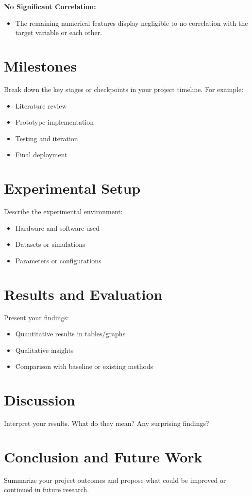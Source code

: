 \documentclass[conference]{IEEEtran}
\begin{document}
\textbf{No Significant Correlation:}
\begin{itemize}
    \item The remaining numerical features display negligible to no correlation
            with the target variable or each other.
\end{itemize}

\section{Milestones}
Break down the key stages or checkpoints in your project timeline. For example:
\begin{itemize}
    \item Literature review
    \item Prototype implementation
    \item Testing and iteration
    \item Final deployment
\end{itemize}

\section{Experimental Setup}
Describe the experimental environment:
\begin{itemize}
    \item Hardware and software used
    \item Datasets or simulations
    \item Parameters or configurations
\end{itemize}

\section{Results and Evaluation}
Present your findings:
\begin{itemize}
    \item Quantitative results in tables/graphs
    \item Qualitative insights
    \item Comparison with baseline or existing methods
\end{itemize}

\begin{figure}[!ht]
    \centering
\end{figure}

\section{Discussion}
Interpret your results. What do they mean? Any surprising findings?

\section{Conclusion and Future Work}
Summarize your project outcomes and propose what could be improved or continued in future research.
\end{document}
